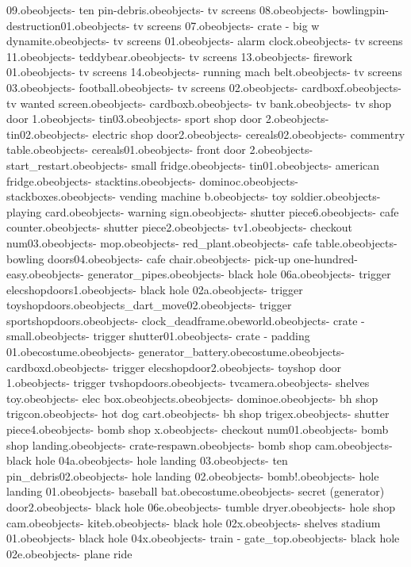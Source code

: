 09.obe objects\bank - ten pin-debris.obe objects\bank - tv screens 08.obe objects\bank - bowlingpin-destruction01.obe objects\bank - tv screens 07.obe objects\bank - crate - big w dynamite.obe objects\bank - tv screens 01.obe objects\bank - alarm clock.obe objects\bank - tv screens 11.obe objects\bank - teddybear.obe objects\bank - tv screens 13.obe objects\bank - firework 01.obe objects\bank - tv screens 14.obe objects\bank - running mach belt.obe objects\bank - tv screens 03.obe objects\bank - football.obe objects\bank - tv screens 02.obe objects\bank - cardboxf.obe objects\bank - tv wanted screen.obe objects\bank - cardboxb.obe objects\bank - tv bank.obe objects\bank - tv shop door  1.obe objects\bank - tin03.obe objects\bank - sport shop door 2.obe objects\bank - tin02.obe objects\bank - electric shop door2.obe objects\bank - cereals02.obe objects\bank - commentry table.obe objects\bank - cereals01.obe objects\bank - front door 2.obe objects\bank - start_restart.obe objects\bank - small fridge.obe objects\bank - tin01.obe objects\bank - american fridge.obe objects\bank - stacktins.obe objects\bank - dominoc.obe objects\bank - stackboxes.obe objects\bank - vending machine b.obe objects\bank - toy soldier.obe objects\bank - playing card.obe objects\bank - warning sign.obe objects\bank - shutter piece6.obe objects\bank - cafe counter.obe objects\bank - shutter piece2.obe objects\bank - tv1.obe objects\bank - checkout num03.obe objects\bank - mop.obe objects\bank - red_plant.obe objects\bank - cafe table.obe objects\bank - bowling doors04.obe objects\bank - cafe chair.obe objects\bank - pick-up one-hundred-easy.obe objects\bank - generator_pipes.obe objects\bank - black hole 06a.obe objects\bank - trigger elecshopdoors1.obe objects\bank - black hole 02a.obe objects\bank - trigger toyshopdoors.obe objects\bank_dart_move02.obe objects\bank - trigger sportshopdoors.obe objects\bank - clock_deadframe.obe world.obe objects\bank - crate - small.obe objects\bank - trigger shutter01.obe objects\bank - crate - padding 01.obe costume\tazrappa.obe objects\bank - generator_battery.obe costume\baseballcap.obe objects\bank - cardboxd.obe objects\bank - trigger elecshopdoor2.obe objects\bank - toyshop door 1.obe objects\bank - trigger tvshopdoors.obe objects\bank - tvcamera.obe objects\bank - shelves toy.obe objects\bank - elec box.obe objects\trolley.obe objects\bank - dominoe.obe objects\bank - bh shop trigcon.obe objects\bank - hot dog cart.obe objects\bank - bh shop trigex.obe objects\bank - shutter piece4.obe objects\bank - bomb shop x.obe objects\bank - checkout num01.obe objects\bank - bomb shop landing.obe objects\bank - crate-respawn.obe objects\bank - bomb shop cam.obe objects\bank - black hole 04a.obe objects\bank - hole landing 03.obe objects\bank - ten pin_debris02.obe objects\bank - hole landing 02.obe objects\bank - bomb!.obe objects\bank - hole landing 01.obe objects\bank - baseball bat.obe costume\dex.obe objects\bank - secret (generator) door2.obe objects\bank - black hole 06e.obe objects\bank - tumble dryer.obe objects\bank - hole shop cam.obe objects\bank - kiteb.obe objects\bank - black hole 02x.obe objects\bank - shelves stadium 01.obe objects\bank - black hole 04x.obe objects\bank - train - gate_top.obe objects\bank - black hole 02e.obe objects\bank - plane ride 